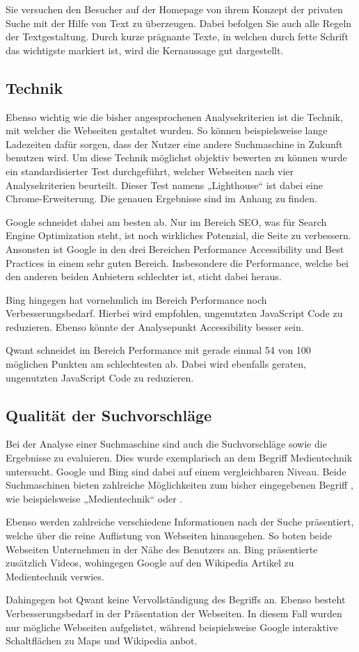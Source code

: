 Sie versuchen den Besucher auf der Homepage von ihrem Konzept der privaten Suche mit der Hilfe von Text zu überzeugen.
Dabei befolgen Sie auch alle Regeln der Textgestaltung\autocite[Seite 5ff]{Maulhardt6}.
Durch kurze prägnante Texte, in welchen durch fette Schrift das wichtigste markiert ist, wird die Kernaussage gut dargestellt.

\subsection{Technik}\label{subsec:technik}
Ebenso wichtig wie die bisher angesprochenen Analysekriterien ist die Technik, mit welcher die Webseiten gestaltet wurden.
So können beispielsweise lange Ladezeiten dafür sorgen, dass der Nutzer eine andere Suchmaschine in Zukunft benutzen wird.
Um diese Technik möglichst objektiv bewerten zu können wurde ein standardisierter Test durchgeführt,
welcher Webseiten nach vier Analysekriterien beurteilt.
Dieser Test namens „Lighthouse“ ist dabei eine Chrome-Erweiterung.
Die genauen Ergebnisse sind im Anhang zu finden.

Google schneidet dabei am besten ab.
Nur im Bereich SEO, was für Search Engine Optimization steht, ist noch wirkliches
Potenzial, die Seite zu verbessern.
Ansonsten ist Google in den drei Bereichen Performance Accessibility und Best Practices in einem sehr guten Bereich.
Insbesondere die Performance, welche bei den anderen beiden Anbietern schlechter ist, sticht dabei heraus.

Bing hingegen hat vornehmlich im Bereich Performance noch Verbesserungsbedarf.
Hierbei wird empfohlen, ungenutzten JavaScript Code zu reduzieren.
Ebenso könnte der Analysepunkt Accessibility besser sein.

Qwant schneidet im Bereich Performance mit gerade einmal 54 von 100 möglichen Punkten am schlechtesten ab.
Dabei wird ebenfalls geraten, ungenutzten JavaScript Code zu reduzieren.

\subsection{Qualität der Suchvorschläge}\label{subsec:qualitat-der-suchvorschlage}
Bei der Analyse einer Suchmaschine sind auch die Suchvorschläge sowie die Ergebnisse zu evaluieren.
Dies wurde exemplarisch an dem Begriff Medientechnik untersucht.
Google und Bing sind dabei auf einem vergleichbaren Niveau.
Beide Suchmaschinen bieten zahlreiche Möglichkeiten zum bisher eingegebenen Begriff  ,
wie beispielsweise „Medientechnik“ oder  .

Ebenso werden zahlreiche verschiedene Informationen nach der Suche präsentiert,
welche über die reine Auflistung von Webseiten hinausgehen.
So boten beide Webseiten Unternehmen in der Nähe des Benutzers an.
Bing präsentierte zusätzlich Videos,
wohingegen Google auf den Wikipedia Artikel zu Medientechnik verwies.

Dahingegen bot Qwant keine Vervollständigung des Begriffs  an.
Ebenso besteht Verbesserungsbedarf in der Präsentation der Webseiten.
In diesem Fall wurden nur mögliche Webseiten aufgelistet,
während beispielsweise Google interaktive Schaltflächen zu Maps und Wikipedia anbot.